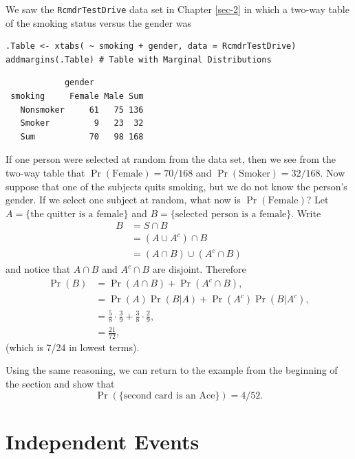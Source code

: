 \documentclass[captions=tableheading]{scrbook}
\begin{document}
\begin{example}
We saw the \texttt{RcmdrTestDrive} data set in Chapter \ref{sec-2} in which a two-way table of the smoking status versus the gender was 


\begin{verbatim}
.Table <- xtabs( ~ smoking + gender, data = RcmdrTestDrive)
addmargins(.Table) # Table with Marginal Distributions
\end{verbatim}

\begin{verbatim}
            gender
 smoking     Female Male Sum
   Nonsmoker     61   75 136
   Smoker         9   23  32
   Sum           70   98 168
\end{verbatim}

If one person were selected at random from the data set, then we see from the two-way table that \(\Pr(\mbox{Female})=70/168\) and \(\Pr(\mbox{Smoker})=32/168\). Now suppose that one of the subjects quits smoking, but we do not know the person's gender. If we select one subject at random, what now is \(\Pr(\mbox{Female})\)? Let \( A = \{ \mbox{the quitter is a female} \} \) and \( B = \{ \mbox{selected person is a female} \} \). Write
\begin{align*}
B & =S\cap B\\
 & =(A\cup A^{c})\cap B\\
 & =(A\cap B)\cup(A^{c}\cap B)
\end{align*}
and notice that \(A\cap B\) and \(A^{c}\cap B\) are disjoint. Therefore
\begin{align*}
\Pr(B) & =\Pr(A\cap B)+\Pr(A^{c}\cap B),\\
 & =\Pr(A)\Pr(B|A)+\Pr(A^{c})\Pr(B|A^{c}),\\
 & =\frac{5}{8}\cdot\frac{3}{9}+\frac{3}{8}\cdot\frac{2}{9},\\
 & =\frac{21}{72},
\end{align*}
(which is 7/24 in lowest terms).

\end{example}
Using the same reasoning, we can return to the example from the beginning of the section and show that
\[
\Pr(\{ \mbox{second card is an Ace} \} )=4/52.
\]
 
\section{Independent Events}
\label{sec-4-7}
\label{sec-Independent-Events}
\end{document}
